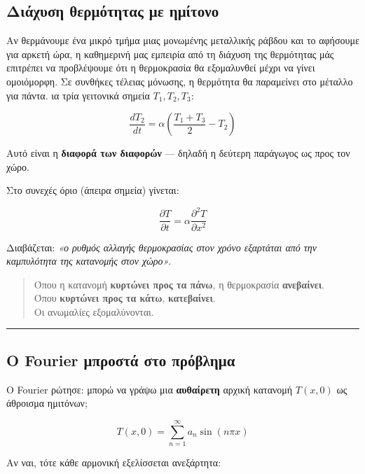 \documentclass[a4paper, 11pt]{article}
\begin{document}
\subsection{Διάχυση θερμότητας με
ημίτονο}\label{ux3b4ux3b9ux3acux3c7ux3c5ux3c3ux3b7-ux3b8ux3b5ux3c1ux3bcux3ccux3c4ux3b7ux3c4ux3b1ux3c2-ux3bcux3b5-ux3b7ux3bcux3afux3c4ux3bfux3bdux3bf}

Αν θερμάνουμε ένα μικρό τμήμα μιας μονωμένης μεταλλικής ράβδου και το
αφήσουμε για αρκετή ώρα, η καθημερινή μας εμπειρία από τη διάχυση της
θερμότητας μάς επιτρέπει να προβλέψουμε ότι η θερμοκρασία θα εξομαλυνθεί
μέχρι να γίνει ομοιόμορφη. Σε συνθήκες τέλειας μόνωσης, η θερμότητα θα
παραμείνει στο μέταλλο για πάντα. ια τρία γειτονικά σημεία
\(T_1, T_2, T_3\):

\[\frac{dT_2}{dt} = \alpha \left(\frac{T_1 + T_3}{2} - T_2\right)\]

Αυτό είναι η \textbf{διαφορά των διαφορών} --- δηλαδή η δεύτερη
παράγωγος ως προς τον χώρο.

Στο συνεχές όριο (άπειρα σημεία) γίνεται:

\[\frac{\partial T}{\partial t} = \alpha \frac{\partial^2 T}{\partial x^2}\]

Διαβάζεται: \emph{«ο ρυθμός αλλαγής θερμοκρασίας στον χρόνο εξαρτάται
από την καμπυλότητα της κατανομής στον χώρο»}.

\begin{quote}
Όπου η κατανομή \textbf{κυρτώνει προς τα πάνω}, η θερμοκρασία
\textbf{ανεβαίνει}.\\
Όπου \textbf{κυρτώνει προς τα κάτω}, \textbf{κατεβαίνει}.\\
Οι ανωμαλίες εξομαλύνονται.
\end{quote}

\begin{center}\rule{0.5\linewidth}{0.5pt}\end{center}

\subsection{Ο Fourier μπροστά στο
πρόβλημα}\label{ux3bf-fourier-ux3bcux3c0ux3c1ux3bfux3c3ux3c4ux3ac-ux3c3ux3c4ux3bf-ux3c0ux3c1ux3ccux3b2ux3bbux3b7ux3bcux3b1}

Ο Fourier ρώτησε: μπορώ να γράψω μια \textbf{αυθαίρετη} αρχική κατανομή
\(T(x, 0)\) ως άθροισμα ημιτόνων;

\[T(x, 0) = \sum_{n=1}^{\infty} a_n \sin(n\pi x)\]

Αν ναι, τότε κάθε αρμονική εξελίσσεται ανεξάρτητα:
\end{document}
